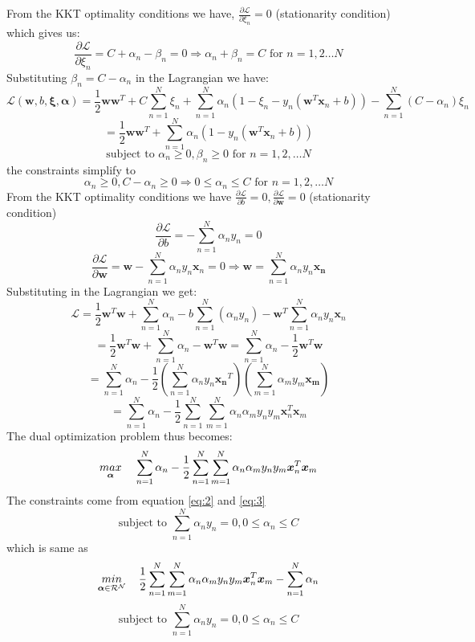 \documentclass{article}
\begin{document}
From the KKT optimality conditions we have, $\frac{\partial \mathcal{L}}{ \partial \xi_n} = 0 $ (stationarity condition) which gives us:
\begin{equation} \label{eq:1}
    \frac{\partial \mathcal{L}}{ \partial \xi_n} = C + \alpha_n - \beta_n = 0  \Rightarrow \alpha_n + \beta_n = C \text{ for } n = 1,2 \dots N  \tag{1}
\end{equation} 
Substituting $\beta_n = C - \alpha_n $ in the Lagrangian we have:
$$ \mathcal{L}(\bm{w}, b, \bm{\xi}, \bm{\alpha}) = \frac{1}{2}\bm{w}\bm{w}^T + C \sum_{n=1}^N \xi_{n} + \sum_{n=1}^N \alpha_n ( 1- \xi_n - y_n(\bm{w}^T \bm{x}_n + b)) - \sum _{n=1}^N (C - \alpha_n) \xi_n$$
$$ =  \frac{1}{2}\bm{w}\bm{w}^T + \sum_{n=1}^N \alpha_n(1-y_n(\bm{w}^T\bm{x}_n+b))$$
$$ \text{subject to  }\alpha_n \geq 0, \beta_n \geq 0 \text{ for } n =1,2, \dots N $$ 
the constraints simplify to 
\begin{equation}\label{eq:2}
    \alpha_n \geq 0, C - \alpha_n \geq 0 \Rightarrow 0 \leq \alpha_n \leq C \text{ for } n=1,2, \dots N \tag{2}
\end{equation}
From the KKT optimality conditions we have $\frac{ \partial \mathcal{L}}{ \partial b} = 0, \frac{\partial \mathcal{L}}{ \partial \bm{w}} = 0 $ (stationarity condition)
\begin{equation} \label{eq:3}
    \frac{ \partial \mathcal{L}}{ \partial b} = - \sum_{n=1}^N \alpha_n y_n = 0 \tag{3}
\end{equation}
$$ \frac{ \partial \mathcal{L}}{ \partial \bm{w}} = \bm{w} - \sum_{n=1}^N \alpha_n y_n \bm{x}_n = 0 \Rightarrow \bm{w} = \sum_{n=1}^{N} \alpha_n y_n \bm{x_n} $$
Substituting in the Lagrangian we get:
$$\mathcal{L} = \frac{1}{2} \bm{w}^T \bm{w} + \sum_{n=1}^N \alpha_n - b \sum_{n=1}^N(\alpha_n y_n) - \bm{w}^T \sum_{n=1}^{N} \alpha_n y_n \bm{x}_n$$
$$ = \frac{1}{2} \bm{w}^T \bm{w} + \sum_{n=1}^N \alpha_n - \bm{w}^T \bm{w} = \sum_{n=1}^N \alpha_n  -\frac{1}{2} \bm{w}^T \bm{w} $$
$$ = \sum_{n=1}^N \alpha_n - \frac{1}{2}(\sum_{n=1}^{N} \alpha_n y_n \bm{x_n}^T)(\sum_{m=1}^{N} \alpha_m y_m \bm{x_m})  $$
$$ = \sum_{n=1}^N \alpha_n - \frac{1}{2} \sum_{n=1}^N \sum_{m=1}^N \alpha_n \alpha_m y_n y_m \bm{x}_n^T \bm{x}_m $$
The dual optimization problem thus becomes:
$$ \underset{\bm{\alpha}}{max} \hspace{4mm} \sum_{n=1}^N \alpha_n - \frac{1}{2} \sum_{n=1}^N \sum_{m=1}^N \alpha_n \alpha_m y_n y_m \bm{x}_n^T \bm{x}_m  $$
The constraints come from equation \eqref{eq:2} and \eqref{eq:3}
$$ \text{subject to } \sum_{n=1}^N \alpha_n y_n = 0, 0  \leq \alpha_n \leq C $$
which is same as 
$$ \underset{\bm{\alpha} \in \mathcal{R}^\mathcal{N} }{min} \hspace{4mm} \frac{1}{2} \sum_{n=1}^N \sum_{m=1}^N \alpha_n \alpha_m y_n y_m \bm{x}_n^T \bm{x}_m  - \sum_{n=1}^N \alpha_n  $$
$$ \text{subject to } \sum_{n=1}^N \alpha_n y_n = 0, 0  \leq \alpha_n \leq C $$
\end{document}
